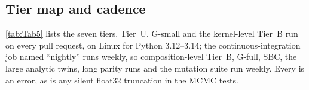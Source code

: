 \subsection{Tier map and cadence}\label{app:tiers}

\cref{tab:Tab5} lists the seven tiers. Tier~U, G-small and the kernel-level Tier~B run on every
pull request, on Linux for Python 3.12--3.14; the continuous-integration job named ``nightly'' runs
weekly, so composition-level Tier~B, G-full, SBC, the large analytic twins, long parity runs and the
mutation suite run weekly. %
Every  is an error, as is any silent float32 truncation in the MCMC tests. %

